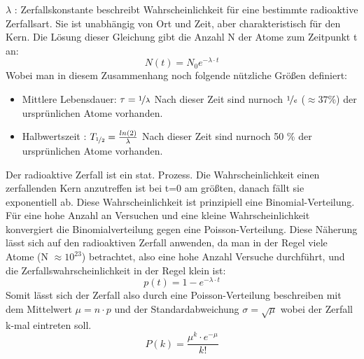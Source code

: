 \documentclass[Ex4_Zusammenfassung.tex]{subfiles}
\begin{document}
\begin{itemize}
$ \lambda $ : Zerfallskonstante beschreibt Wahrscheinlichkeit für eine bestimmte radioaktive Zerfallsart. Sie ist unabhängig von Ort und Zeit, aber charakteristisch für den Kern. \newline
Die Lösung dieser Gleichung gibt die Anzahl N der Atome zum Zeitpunkt t an: 
\begin{equation}
N(t) = N_{0} e^{-\lambda \cdot t}
\end{equation}  
Wobei man in diesem Zusammenhang noch folgende nützliche Größen definiert: 
\begin{itemize}
\item Mittlere Lebensdauer: $ \tau = \nicefrac{1}{\lambda} $ \newline 
Nach dieser Zeit sind nurnoch $\nicefrac{1}{e} $ ($ \approx 37 \% $) der ursprünlichen Atome vorhanden.
\item Halbwertszeit : $ T_{\nicefrac{1}{2}} = \frac{ln(2)}{\lambda} $
Nach dieser Zeit sind nurnoch 50 \% der ursprünlichen Atome vorhanden.
\end{itemize}
\end{itemize}
Der radioaktive Zerfall ist ein stat. Prozess. Die Wahrscheinlichkeit einen zerfallenden Kern anzutreffen ist bei t=0 am größten, danach fällt sie exponentiell ab. 
Diese Wahrscheinlichkeit ist prinzipiell eine Binomial-Verteilung. Für eine hohe Anzahl an Versuchen und eine kleine Wahrscheinlichkeit konvergiert die Binomialverteilung gegen eine Poisson-Verteilung. Diese Näherung lässt sich auf den radioaktiven Zerfall anwenden, da man in der Regel viele Atome (N $\approx 10^{23} $) betrachtet, also eine hohe Anzahl Versuche durchführt, und die Zerfallswahrscheinlichkeit in der Regel klein ist: 
\begin{equation}
p(t) = 1 - e^{-\lambda \cdot t} 
\end{equation}
Somit lässt sich der Zerfall also durch eine Poisson-Verteilung beschreiben mit dem Mittelwert $ \mu = n\cdot p $ und der Standardabweichung  $ \sigma = \sqrt{\mu} $ wobei der Zerfall k-mal eintreten soll. 
\begin{equation}
P(k) = \frac{\mu^k \cdot e^{-\mu} } {k!} 
\end{equation}
\end{document}
